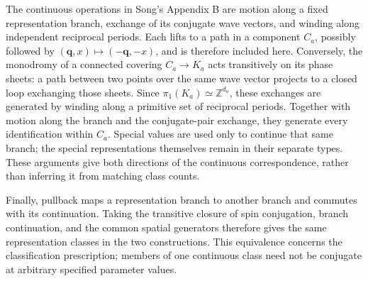The continuous operations in Song's Appendix B are motion
along a fixed representation branch, exchange of its conjugate
wave vectors, and winding along independent reciprocal periods.
Each lifts to a path in a component $C_a$, possibly followed
by $(\bm q,x)\mapsto(-\bm q,-x)$, and is therefore included
here. Conversely, the monodromy of a connected covering
$C_a\to K_a$ acts transitively on its phase sheets: a path
between two points over the same wave vector projects to a
closed loop exchanging those sheets. Since
$\pi_1(K_a)\simeq\mathbb Z^{d_a}$, these exchanges are generated
by winding along a primitive set of reciprocal periods.
Together with motion along the branch and the conjugate-pair
exchange, they generate every identification within $C_a$.
Special values are used only to continue that same branch;
the special representations themselves remain in their
separate types. These arguments give both directions of the
continuous correspondence, rather than inferring it from
matching class counts.

Finally, pullback maps a representation branch to another
branch and commutes with its continuation. Taking the
transitive closure of spin conjugation, branch continuation,
and the common spatial generators therefore gives the same
representation classes in the two constructions. This
equivalence concerns the classification prescription; members
of one continuous class need not be conjugate at arbitrary
specified parameter values.

\endgroup
\setcounter{equation}{38}
